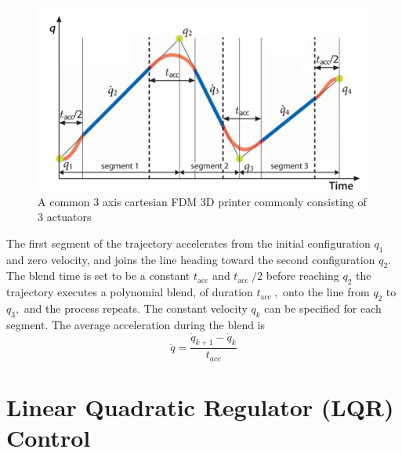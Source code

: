 \documentclass{UoNMCHA}
\numberwithin{equation}{section}
\begin{document}
	\begin{figure}[H]
		\begin{center}
			\includegraphics[width=.8\linewidth]{figs/Picture11}
			\caption{A  common 3 axis cartesian FDM 3D printer commonly consisting of 3 actuators}
			\label{figs/Picture11}
		\end{center}
	\end{figure}
	
	The first segment of the trajectory accelerates from the initial configuration $q_{1}$ and zero velocity, and
	joins the line heading toward the second configuration $q_{2}$. The blend time is set to be a constant $t_{\mathrm{acc}}$
	and $t_{\text {acc }} / 2$ before reaching $q_{2}$ the trajectory executes a polynomial blend, of duration $t_{\text {acc }},$ onto the line
	from $q_{2}$ to $q_{3},$ and the process repeats. The constant velocity $q_{k}$ can be specified for each segment. The
	average acceleration during the blend is
	$$
	\ddot{q}=\frac{\dot{q}_{k+1}-\dot{q}_{k}}{t_{a c c}}
	$$
	
	\section{Linear Quadratic Regulator (LQR) Control}
	
\end{document}
